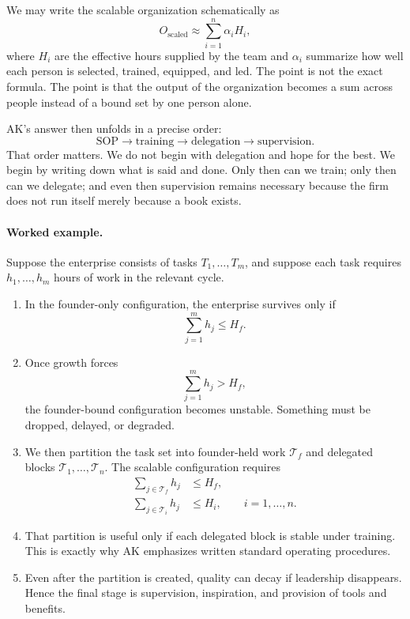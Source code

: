 We may write the scalable organization schematically as
\begin{equation}
O_{\text{scaled}} \approx \sum_{i=1}^{n} \alpha_i H_i,
\end{equation}
where \(H_i\) are the effective hours supplied by the team and \(\alpha_i\) summarize how well each person is selected, trained, equipped, and led. The point is not the exact formula. The point is that the output of the organization becomes a sum across people instead of a bound set by one person alone.

AK's answer then unfolds in a precise order:
\begin{equation}
\mathrm{SOP} \longrightarrow \mathrm{training} \longrightarrow \mathrm{delegation} \longrightarrow \mathrm{supervision}.
\end{equation}
That order matters. We do not begin with delegation and hope for the best. We begin by writing down what is said and done. Only then can we train; only then can we delegate; and even then supervision remains necessary because the firm does not run itself merely because a book exists.

\paragraph{Worked example.}
Suppose the enterprise consists of tasks \(T_1,\dots,T_m\), and suppose each task requires \(h_1,\dots,h_m\) hours of work in the relevant cycle.

\begin{enumerate}
\item In the founder-only configuration, the enterprise survives only if
\begin{equation}
\sum_{j=1}^{m} h_j \le H_f.
\end{equation}

\item Once growth forces
\begin{equation}
\sum_{j=1}^{m} h_j > H_f,
\end{equation}
the founder-bound configuration becomes unstable. Something must be dropped, delayed, or degraded.

\item We then partition the task set into founder-held work \(\mathcal{T}_f\) and delegated blocks \(\mathcal{T}_1,\dots,\mathcal{T}_n\). The scalable configuration requires
\begin{align}
\sum_{j \in \mathcal{T}_f} h_j &\le H_f,\\
\sum_{j \in \mathcal{T}_i} h_j &\le H_i, \qquad i=1,\dots,n.
\end{align}

\item That partition is useful only if each delegated block is stable under training. This is exactly why AK emphasizes written standard operating procedures.

\item Even after the partition is created, quality can decay if leadership disappears. Hence the final stage is supervision, inspiration, and provision of tools and benefits.
\end{enumerate}

